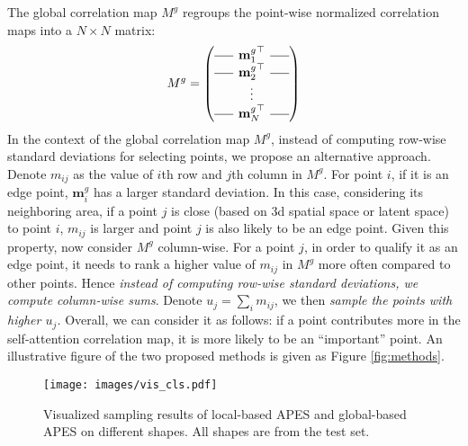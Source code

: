 \documentclass[10pt,twocolumn,letterpaper]{article}
\newcommand{\bm}{\mathbf{m}}\newcommand{\bM}{\mathbf{M}}
\begin{document}
The global correlation map $M^g$ regroups the point-wise normalized correlation maps into a $N\times N$ matrix:
\begin{equation}
M^g = 
\begin{pmatrix}
\rule[.5ex]{1.5em}{0.4pt} \hspace{-0.6em} & {\bm^g_{1}}^{\top} & \hspace{-0.6em} \rule[.5ex]{1.5em}{0.4pt} \\
\rule[.5ex]{1.5em}{0.4pt} \hspace{-0.6em} & {\bm^g_{2}}^{\top} & \hspace{-0.6em} \rule[.5ex]{1.5em}{0.4pt} \\
  & \vdots  &   \\
\rule[.5ex]{1.5em}{0.4pt} \hspace{-0.6em} & {\bm^g_{N}}^{\!\!\top} & \hspace{-0.6em} \rule[.5ex]{1.5em}{0.4pt}
\end{pmatrix}
\end{equation}
In the context of the global correlation map $M^g$, instead of computing row-wise standard deviations for selecting points, we propose an alternative approach. 
Denote $m_{ij}$ as the value of $i$th row and $j$th column in $M^g$. For point $i$, if it is an edge point, $\bm^g_i$ has a larger standard deviation. In this case, considering its neighboring area, if a point $j$ is close (based on 3d spatial space or latent space) to point $i$, $m_{ij}$ is larger and point $j$ is also likely to be an edge point. Given this property, now consider $M^g$ column-wise. For a point $j$, in order to qualify it as an edge point, it needs to rank a higher value of $m_{ij}$ in $M^g$ more often compared to other points.
Hence \emph{instead of computing row-wise standard deviations, we compute column-wise sums}. 
Denote $u_j = \sum_i m_{ij}$, we then \emph{sample the points with higher $u_j$.}
Overall, we can consider it as follows: if a point contributes more in the self-attention correlation map, it is more likely to be an \enquote{important} point.
An illustrative figure of the two proposed methods is given as Figure \ref{fig:methods}. 

\begin{figure*}[t]
    \centering
    \texttt{[image: images/vis\_cls.pdf]}
    \caption{Visualized sampling results of local-based APES and global-based APES on different shapes. All shapes are from the test set.}
    \label{fig:vis_cls}
\end{figure*}
\end{document}
